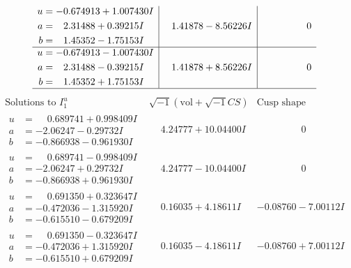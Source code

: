 \documentclass[1p]{elsarticle_modified}
\theoremstyle{definition}
\newcommand{\I}{\sqrt{-1}}
\begin{document}
$$\begin{array}{c|c|c}
\begin{aligned}
u &= -0.674913 + 1.007430 I \\
a &= \phantom{-}2.31488 + 0.39215 I \\
b &= \phantom{-}1.45352 - 1.75153 I\end{aligned}
 & \phantom{-}1.41878 - 8.56226 I & \phantom{-0.000000 } 0 \\ \hline\begin{aligned}
u &= -0.674913 - 1.007430 I \\
a &= \phantom{-}2.31488 - 0.39215 I \\
b &= \phantom{-}1.45352 + 1.75153 I\end{aligned}
 & \phantom{-}1.41878 + 8.56226 I & \phantom{-0.000000 } 0\\
 \hline 
 \end{array}$$\newpage$$\begin{array}{c|c|c}  
\text{Solutions to }I^u_{1}& \I (\text{vol} + \sqrt{-1}CS) & \text{Cusp shape}\\
 \hline 
\begin{aligned}
u &= \phantom{-}0.689741 + 0.998409 I \\
a &= -2.06247 - 0.29732 I \\
b &= -0.866938 - 0.961930 I\end{aligned}
 & \phantom{-}4.24777 + 10.04400 I & \phantom{-0.000000 } 0 \\ \hline\begin{aligned}
u &= \phantom{-}0.689741 - 0.998409 I \\
a &= -2.06247 + 0.29732 I \\
b &= -0.866938 + 0.961930 I\end{aligned}
 & \phantom{-}4.24777 - 10.04400 I & \phantom{-0.000000 } 0 \\ \hline\begin{aligned}
u &= \phantom{-}0.691350 + 0.323647 I \\
a &= -0.472036 - 1.315920 I \\
b &= -0.615510 - 0.679209 I\end{aligned}
 & \phantom{-}0.16035 + 4.18611 I & -0.08760 - 7.00112 I \\ \hline\begin{aligned}
u &= \phantom{-}0.691350 - 0.323647 I \\
a &= -0.472036 + 1.315920 I \\
b &= -0.615510 + 0.679209 I\end{aligned}
 & \phantom{-}0.16035 - 4.18611 I & -0.08760 + 7.00112 I \\ \hline\begin{aligned}

\end{aligned}
\end{array}$$
\end{document}

